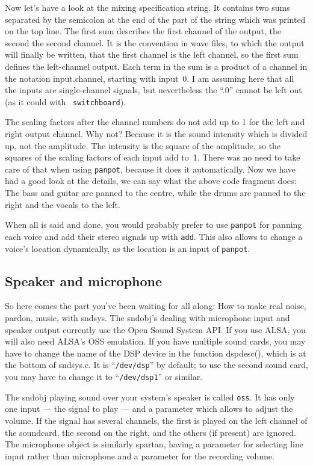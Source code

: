 \documentclass{article}
\def\sn{{\sc sndsys}}
\begin{document}
Now let's have a look at the mixing specification string.  It contains two sums
separated by the semicolon at the end of the part of the string which was
printed on the top line.  The first sum describes the first channel of the
output, the second the second channel.  It is the convention in wave files, to
which the output will finally be written, that the first channel is the left
channel, so the first sum defines the left-channel output.  Each term in the
sum is a product of a channel in the notation input.channel, starting with
input~0.  I am assuming here that all the inputs are single-channel signals,
but nevertheless the ``.0'' cannot be left out (as it could with {\tt
switchboard}).

The scaling factors after the channel numbers do not add up to 1 for the left
and right output channel.  Why not?  Because it is the sound intensity which is
divided up, not the amplitude.  The intensity is the square of the amplitude,
so the squares of the scaling factors of each input add to~1.  There was no
need to take care of that when using {\tt panpot}, because it does it
automatically.  Now we have had a good look at the details, we can say what the
above code fragment does: The bass and guitar are panned to the centre, while
the drums are panned to the right and the vocals to the left.

When all is said and done, you would probably prefer to use {\tt panpot} for
panning each voice and add their stereo signals up with {\tt add}.  This also
allows to change a voice's location dynamically, as the location is an input of
{\tt panpot}.


\subsection{Speaker and microphone}
\label{sec:speaker}

So here comes the part you've been waiting for all along: How to make real
noise, pardon, music, with \sn.  The sndobj's dealing with microphone input and
speaker output currently use the Open Sound System API.  If you use ALSA, you
will also need ALSA's OSS emulation.  If you have multiple sound cards, you may
have to change the name of the DSP device in the function dspdesc(), which is
at the bottom of sndsys.c.  It is ``{\tt /dev/dsp}'' by default; to use the
second sound card, you may have to change it to ``{\tt /dev/dsp1}'' or similar.

The sndobj playing sound over your system's speaker is called {\tt oss}.  It
has only one input --- the signal to play --- and a parameter which allows to
adjust the volume.  If the signal has several channels, the first is played on
the left channel of the soundcard, the second on the right, and the others (if
present) are ignored.  The microphone object is similarly spartan, having a
parameter for selecting line input rather than microphone and a parameter for
the recording volume.
\end{document}
